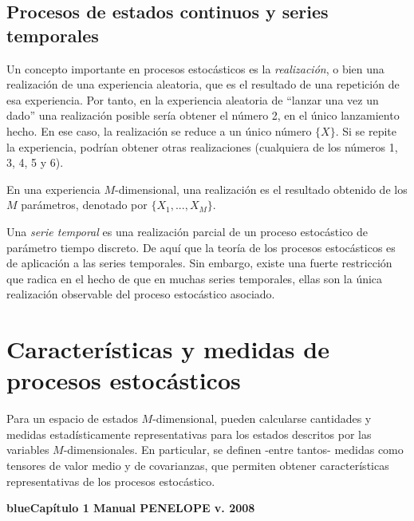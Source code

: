 \subsection{Procesos de estados continuos y series temporales}
\label{CapVI_4}

Un concepto importante en procesos estoc\'asticos es la \textsl{realizaci\'on}, o bien una realizaci\'on de una experiencia aleatoria, 
que es el resultado de una repetici\'on de esa experiencia. 
%
Por tanto, en la experiencia aleatoria de ``lanzar una vez un dado'' una realizaci\'on posible ser\'ia obtener el n\'umero 2, en el \'unico 
lanzamiento hecho. 
%
En ese caso, la realizaci\'on se reduce a un \'unico n\'umero $\{X\}$. 
%
Si se repite la experiencia, podr\'ian obtener otras realizaciones (cualquiera de los n\'umeros 1, 3, 4, 5 y 6).
%

En una experiencia $M$-dimensional, una realizaci\'on es el resultado obtenido de los $M$ par\'ametros, denotado por $\{X_{1}, ..., X_{M} \}$.
%

Una \textsl{serie temporal} es una realizaci\'on parcial de un proceso estoc\'astico de par\'ametro tiempo discreto.
%
De aqu\'i que la teor\'ia de los procesos estoc\'asticos es de aplicaci\'on a las series temporales.
%
Sin embargo, existe una fuerte restricci\'on que radica en el hecho de que en muchas series temporales, ellas son la \'unica realizaci\'on 
observable del proceso estoc\'astico asociado.
%

\section{Caracter\'isticas y medidas de procesos estoc\'asticos}
\label{CapVI_5}

Para un espacio de estados $M$-dimensional, pueden calcularse cantidades y medidas estad\'isticamente representativas para los estados 
descritos por las variables $M$-dimensionales.
%
En particular, se definen -entre tantos- medidas como tensores de valor medio y de covarianzas, que permiten obtener caracter\'isticas 
representativas de los procesos estoc\'astico.
%


\begin{center}
{\bf {blue}{Cap\'itulo 1 Manual PENELOPE v. 2008}}
\end{center}



